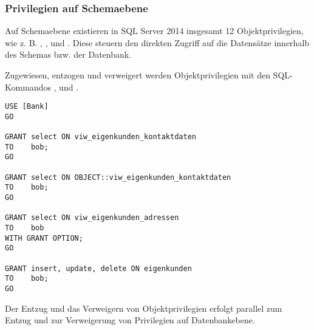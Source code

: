         \subsubsection{Privilegien auf Schemaebene}
          Auf Schemaebene existieren in SQL Server 2014 insgesamt 12
          Objektprivilegien, wie z. B. , ,
           und . Diese steuern den direkten
          Zugriff auf die Datensätze innerhalb des Schemas bzw. der Datenbank.
        
          Zugewiesen, entzogen und verweigert werden Objektprivilegien mit den
          SQL-Kommandos ,  und
          .
          \begin{lstlisting}[language=ms_sql,caption={Erteilen
          von Objektprivilegien},label=sql19_22]
USE [Bank]
GO

GRANT select ON viw_eigenkunden_kontaktdaten
TO    bob;
GO

GRANT select ON OBJECT::viw_eigenkunden_kontaktdaten
TO    bob;
GO

GRANT select ON viw_eigenkunden_adressen
TO    bob
WITH GRANT OPTION;
GO        

GRANT insert, update, delete ON eigenkunden
TO    bob;
GO  
          \end{lstlisting}
          Der Entzug und das Verweigern von Objektprivilegien erfolgt parallel
          zum Entzug und zur Verweigerung von Privilegien auf Datenbankebene.
          \begin{literaturinternet}
            \item \cite{ms188371}
            \item \cite{ms187965}
          \end{literaturinternet}
